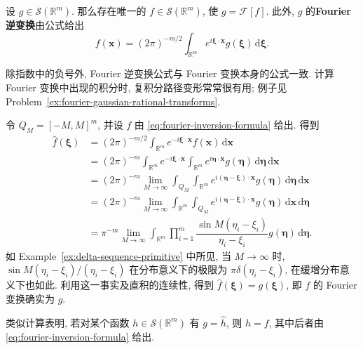 \begin{Theorem}
\label{thm:fourier-inversion}
设 $g\in\mathcal{S}(\mathbb{R}^m)$. 那么存在唯一的 $f\in\mathcal{S}(\mathbb{R}^m)$, 使 $g=\mathcal{F}[f]$. 此外, $g$ 的\textbf{Fourier 逆变换}由公式给出
\begin{equation}\label{eq:fourier-inversion-formula}
f(\bm{x})=(2\pi)^{-m/2}\int_{\mathbb{R}^m}e^{i\bm{\xi}\cdot\bm{x}}g(\bm{\xi})\,\mathrm{d}\bm{\xi}.
\end{equation}

\end{Theorem}

除指数中的负号外, Fourier 逆变换公式与 Fourier 变换本身的公式一致. 计算 Fourier 变换中出现的积分时, 复积分路径变形常常很有用; 例子见 Problem~\ref{ex:fourier-gaussian-rational-transforms}.

\begin{Proof}
令 $Q_M=[-M,M]^m$, 并设 $f$ 由 \eqref{eq:fourier-inversion-formula} 给出. 得到
\begin{equation}\label{eq:fourier-inversion-cutoff-calculation}
\begin{aligned}
\widehat f(\bm{\xi})&=(2\pi)^{-m/2}\int_{\mathbb{R}^m}e^{-i\bm{\xi}\cdot\bm{x}}f(\bm{x})\,\mathrm{d}\bm{x}\\
&=(2\pi)^{-m}\int_{\mathbb{R}^m}e^{-i\bm{\xi}\cdot\bm{x}}\int_{\mathbb{R}^m}e^{i\bm{\eta}\cdot\bm{x}}g(\bm{\eta})\,\mathrm{d}\bm{\eta}\,\mathrm{d}\bm{x}\\
&=(2\pi)^{-m}\lim_{M\to\infty}\int_{Q_M}\int_{\mathbb{R}^m}e^{i(\bm{\eta}-\bm{\xi})\cdot\bm{x}}g(\bm{\eta})\,\mathrm{d}\bm{\eta}\,\mathrm{d}\bm{x}\\
&=(2\pi)^{-m}\lim_{M\to\infty}\int_{\mathbb{R}^m}\int_{Q_M}e^{i(\bm{\eta}-\bm{\xi})\cdot\bm{x}}g(\bm{\eta})\,\mathrm{d}\bm{x}\,\mathrm{d}\bm{\eta}\\
&=\pi^{-m}\lim_{M\to\infty}\int_{\mathbb{R}^m}\prod_{i=1}^m\dfrac{\sin M(\eta_i-\xi_i)}{\eta_i-\xi_i}g(\bm{\eta})\,\mathrm{d}\bm{\eta}.
\end{aligned}
\end{equation}
如 Example~\ref{ex:delta-sequence-primitive} 中所见, 当 $M\to\infty$ 时, $\sin M(\eta_i-\xi_i)/(\eta_i-\xi_i)$ 在分布意义下的极限为 $\pi\delta(\eta_i-\xi_i)$, 在缓增分布意义下也如此. 利用这一事实及直积的连续性, 得到 $\widehat f(\bm{\xi})=g(\bm{\xi})$, 即 $f$ 的 Fourier 变换确实为 $g$.

类似计算表明, 若对某个函数 $h\in\mathcal{S}(\mathbb{R}^m)$ 有 $g=\widehat h$, 则 $h=f$, 其中后者由 \eqref{eq:fourier-inversion-formula} 给出.
\end{Proof}


